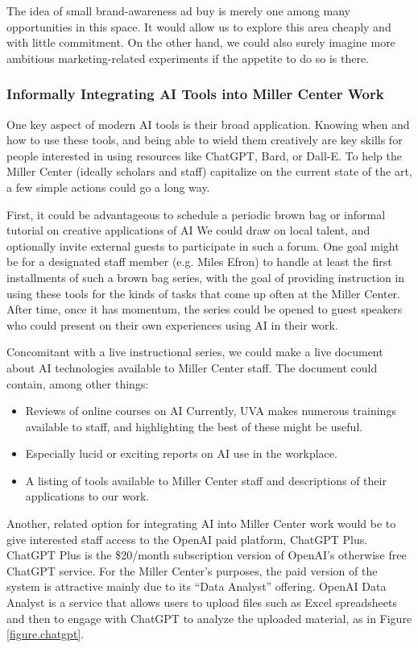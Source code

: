\documentclass[12pt, oneside]{article}   	%
\begin{document}
The idea of small brand-awareness ad buy is merely one among many opportunities in this space.  It would allow us to explore this area cheaply and with little commitment.  On the other hand, we could also surely imagine more ambitious marketing-related experiments if the appetite to do so is there.


\subsubsection{Informally Integrating AI Tools into Miller Center Work}\label{section.application.easy.daily-work}
One key aspect of modern AI tools is their broad application.  Knowing when and how to use these tools, and being able to wield them creatively are key skills for people interested in using resources like ChatGPT, Bard, or Dall-E.  To help the Miller Center (ideally scholars and staff) capitalize on the current state of the art, a few simple actions could go a long way.

First, it could be advantageous to schedule a periodic brown bag or informal tutorial on creative applications of AI We could draw on local talent, and optionally invite external guests to participate in such a forum.  One goal might be for a designated staff member (e.g. Miles Efron) to handle at least the first installments of such a brown bag series, with the goal of providing instruction in using these tools for the kinds of tasks that come up often at the Miller Center.  After time, once it has momentum, the series could be opened to guest speakers who could present on their own experiences using AI in their work.

Concomitant with a live instructional series, we could make a live document about AI technologies available to Miller Center staff.  The document could contain, among other things:
\begin{itemize}
\item Reviews of online courses on AI Currently, UVA makes numerous trainings available to staff, and highlighting the best of these might be useful.
\item Especially lucid or exciting reports on AI use in the workplace.
\item A listing of tools available to Miller Center staff and descriptions of their applications to our work.
\end{itemize}
Another, related option for integrating AI into Miller Center work would be to give interested staff access to the OpenAI paid platform, ChatGPT Plus.  ChatGPT Plus is the \$20/month subscription version of OpenAI’s otherwise free ChatGPT service.  For the Miller Center’s purposes, the paid version of the system is attractive mainly due to its “Data Analyst” offering.  OpenAI Data Analyst is a service that allows users to upload files such as Excel spreadsheets and then to engage with ChatGPT to analyze the uploaded material, as in Figure \ref{figure.chatgpt}.
\end{document}
